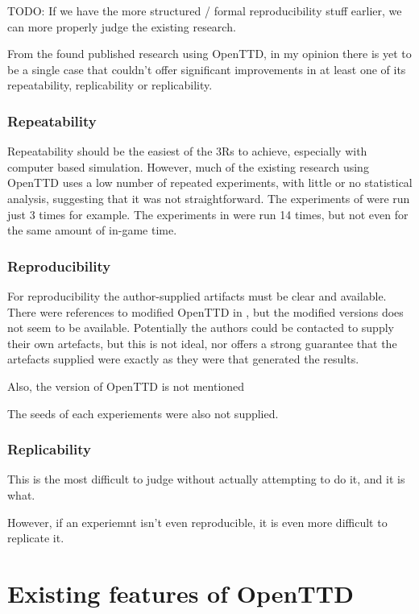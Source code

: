 \documentclass[logo,msc]{infthesis}           %
\begin{document}
TODO: If we have the more structured / formal reproducibility stuff earlier, we can more properly judge the existing research.

From the found published research using OpenTTD, in my opinion there is yet to be a single case that couldn't offer significant improvements in at least one of its repeatability, replicability or replicability.

\subsection{Repeatability}

Repeatability should be the easiest of the 3Rs to achieve, especially with computer based simulation. However, much of the existing research using OpenTTD uses a low number of repeated experiments, with little or no statistical analysis, suggesting that it was not straightforward. The experiments of \cite{wisniewski2011artificial} were run just 3 times for example. The experiments in \cite{rios2009trains} were run 14 times, but not even for the same amount of in-game time.

\subsection{Reproducibility}

For reproducibility the author-supplied artifacts must be clear and available. There were references to modified OpenTTD in \cite{wisniewski2011artificial}, but the modified versions does not seem to be available. Potentially the authors could be contacted to supply their own artefacts, but this is not ideal, nor offers a strong guarantee that the artefacts supplied were exactly as they were that generated the results.

Also, the version of OpenTTD is not mentioned

The seeds of each experiements were also not supplied.

\subsection{Replicability}

This is the most difficult to judge without actually attempting to do it, and it is what.

However, if an experiemnt isn't even reproducible, it is even more difficult to replicate it.

\chapter{Existing features of OpenTTD}
\end{document}
